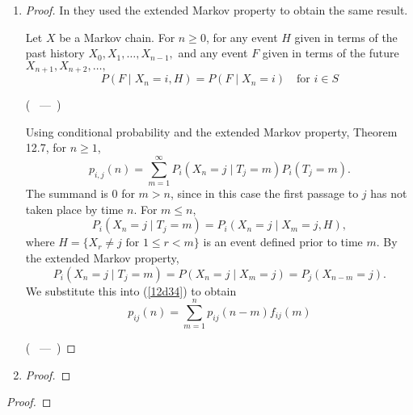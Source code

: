 \documentclass[a4paper, 11pt, oneside]{article}
\let\oldquote\quote
\let\endoldquote\endquote
\renewenvironment{quote}[2][]
  {\if\relax\detokenize{#1}\relax
     \def\quoteauthor{#2}%
   \else
     \def\quoteauthor{#2~---~#1}%
   \fi
   \oldquote}
  {\par\nobreak\smallskip\hfill(\quoteauthor)%
   \endoldquote\addvspace{\bigskipamount}}
\newenvironment{problem}[1]
  {\renewcommand\theinnercustomprob{#1}\innercustomprob}
  {\endinnercustomprob}
\begin{document}
 \begin{enumerate}
 \item
\begin{proof}
In \cite[Theorem 12.33]{markov} they used the extended Markov property to obtain the same result.

\begin{quote}{\cite[Theorem 12.7]{markov} }{(Extended Markov prop)}
Let $X$ be a Markov chain. For $n \geq 0$, for any event $H$ given in terms of the past history $X_0, X_1, \ldots, X_{n-1},$ and any event $F$ given in terms of the future $X_{n+1}, X_{n+2}, \ldots,$
\begin{equation*}
P(F \mid X_n = i, H) = P(F \mid X_n = i) \quad \text{for } i \in S
\end{equation*} 
\end{quote}

\begin{quote}{\cite[Theorem 12.33]{markov} }{}
Using conditional probability and the extended Markov property, Theorem 12.7, for $n \geq 1$,
 \begin{equation}\label{12d34}
p_{i,j}(n) = \sum^{\infty}_{m=1}P_i (X_n = j \mid T_j = m)P_i(T_j =m).
\end{equation} 
The summand is 0 for $m > n$, since in this case the first passage to $j$ has not taken place by time $n$. For $m \leq n$, 
\begin{equation*} 
P_i(X_n = j \mid T_j=m)=P_i(X_n = j \mid X_m = j, H),
\end{equation*} 
where $H = \{X_r \neq j \text{ for } 1\leq r < m \}$ is an event defined prior to time $m$. By the extended Markov property,
\begin{equation*} 
P_i(X_n = j \mid T_j=m)=P(X_n = j \mid X_m = j) = P_j(X_{n-m}=j).
\end{equation*} 
We substitute this into (\ref{12d34}) to obtain
\begin{equation*} 
p_{ij}(n) = \sum_{m=1}^n p_{ij}(n-m) f_{ij}(m)
\end{equation*} 
\end{quote}
\end{proof}		

 \item
\begin{proof}

\end{proof}		
  \end{enumerate}
  
 \begin{problem}{11}\label{problem11}
\end{problem}
\begin{proof}

\end{proof}		
\end{document}
